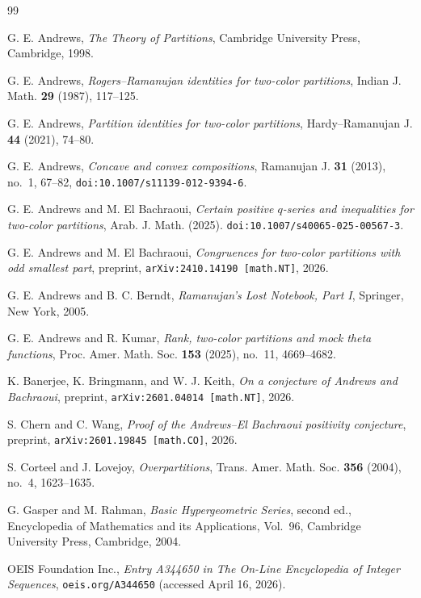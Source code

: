 \documentclass[reqno]{amsart}
\theoremstyle{plain}
\theoremstyle{definition}
\theoremstyle{remark}
\numberwithin{equation}{section}
\begin{document}
\begin{thebibliography}{99}

G. E. Andrews,
\emph{The Theory of Partitions},
Cambridge University Press, Cambridge, 1998.

G. E. Andrews,
\emph{Rogers--Ramanujan identities for two-color partitions},
Indian J. Math. \textbf{29} (1987), 117--125.

G. E. Andrews,
\emph{Partition identities for two-color partitions},
Hardy--Ramanujan J. \textbf{44} (2021), 74--80.

G. E. Andrews,
\emph{Concave and convex compositions},
Ramanujan J. \textbf{31} (2013), no.~1, 67--82,
\texttt{doi:10.1007/s11139-012-9394-6}.

G. E. Andrews and M. El Bachraoui,
\emph{Certain positive $q$-series and inequalities for two-color partitions},
Arab. J. Math. (2025). \texttt{doi:10.1007/s40065-025-00567-3}.

G. E. Andrews and M. El Bachraoui,
\emph{Congruences for two-color partitions with odd smallest part},
preprint, \texttt{arXiv:2410.14190 [math.NT]}, 2026.

G. E. Andrews and B. C. Berndt,
\emph{Ramanujan's Lost Notebook, Part I},
Springer, New York, 2005.

G. E. Andrews and R. Kumar,
\emph{Rank, two-color partitions and mock theta functions},
Proc. Amer. Math. Soc. \textbf{153} (2025), no.~11, 4669--4682.

K. Banerjee, K. Bringmann, and W. J. Keith,
\emph{On a conjecture of Andrews and Bachraoui},
preprint, \texttt{arXiv:2601.04014 [math.NT]}, 2026.

S. Chern and C. Wang,
\emph{Proof of the Andrews--El Bachraoui positivity conjecture},
preprint, \texttt{arXiv:2601.19845 [math.CO]}, 2026.

S. Corteel and J. Lovejoy,
\emph{Overpartitions},
Trans. Amer. Math. Soc. \textbf{356} (2004), no.~4, 1623--1635.

G. Gasper and M. Rahman,
\emph{Basic Hypergeometric Series}, second ed.,
Encyclopedia of Mathematics and its Applications, Vol.~96,
Cambridge University Press, Cambridge, 2004.

OEIS Foundation Inc.,
\emph{Entry A344650 in The On-Line Encyclopedia of Integer Sequences},
\texttt{oeis.org/A344650} (accessed April 16, 2026).

\end{thebibliography}
\end{document}
